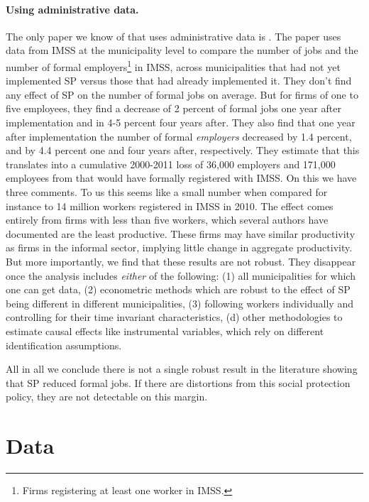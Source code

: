 \documentclass[oneside,11pt]{article}
\begin{document}
\paragraph{Using administrative data.} The only paper we know of that uses administrative data is \cite{Campos}. The paper uses data from IMSS at the municipality level to compare the number of jobs and the number of formal employers\footnote{Firms registering at least one worker in IMSS.} in IMSS, across municipalities that had not yet implemented SP versus those that had already implemented it. They don't find any effect of SP on the number of formal jobs on average. But for firms of one to five employees, they find a decrease of 2 percent of formal jobs one year after implementation and in 4-5 percent four years after. They also find that one year after implementation the number of formal \textit{employers} decreased by 1.4 percent, and by 4.4 percent one and four years after, respectively. They estimate that this translates into a cumulative 2000-2011 loss of 36,000 employers and 171,000 employees from that would have formally registered with IMSS. On this we have three comments. To us this seems like a small number when compared for instance to 14 million workers registered in IMSS in 2010. The effect comes entirely from firms with less than five workers, which several authors have documented are the least productive. These firms may have similar productivity as firms in the informal sector, implying little change in aggregate productivity. But more importantly, we find that these results are not robust. They disappear once the analysis includes \textit{either} of the following: (1) all municipalities for which one can get data, (2) econometric methods which are robust to the effect of SP being different in different municipalities, (3) following workers individually and controlling for their time invariant characteristics, (d) other methodologies to estimate causal effects like instrumental variables, which rely on different identification assumptions. 

\vspace{.1in}
\noindent All in all we conclude there is not a single robust result in the literature showing that SP reduced formal jobs. If there are distortions from this social protection policy, they are not detectable on this margin.





\section{Data} \label{data}
\end{document}
